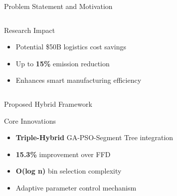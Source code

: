 \documentclass[aspectratio=169,12pt]{beamer}
\newcommand{\performance}[1]{\textcolor{secondary}{\textbf{#1}}}
\newcommand{\technical}[1]{\textcolor{primary}{\textbf{#1}}}
\begin{document}
\begin{frame}{Problem Statement and Motivation}
\begin{columns}[T]
\begin{column}{0.5\textwidth}
\vspace{0.1cm}
\begin{exampleblock}{Research Impact}
\begin{itemize}
    \item Potential \$50B logistics cost savings
    \item Up to \textbf{15\%} emission reduction
    \item Enhances smart manufacturing efficiency
\end{itemize}
\end{exampleblock}
\end{column}
\end{columns}
\end{frame}
\begin{frame}{Proposed Hybrid Framework}
\begin{exampleblock}{Core Innovations}
\begin{itemize}
    \item \technical{Triple-Hybrid} GA-PSO-Segment Tree integration
    \item \performance{15.3\%} improvement over FFD
    \item \technical{O(log n)} bin selection complexity
    \item Adaptive parameter control mechanism
\end{itemize}
\end{exampleblock}


\end{frame}
\end{document}
